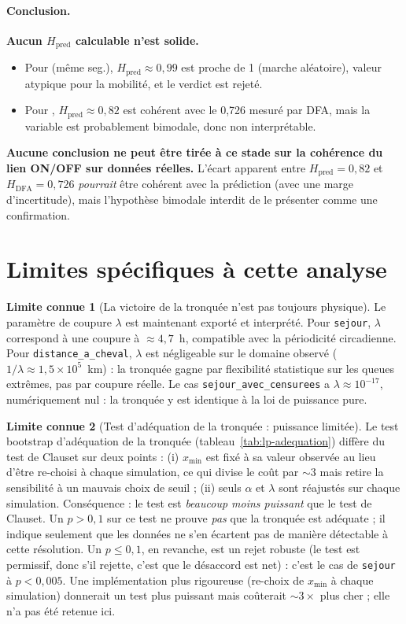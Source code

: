 \documentclass[12pt,a4paper]{report}
\theoremstyle{definition}
\newtheorem{limite}{Limite connue}[chapter]
\DeclareRobustCommand{\code}[1]{\texorpdfstring{\texttt{\detokenize{#1}}}{\detokenize{#1}}}
\begin{document}
\paragraph{Conclusion.} \textbf{Aucun $H_{\text{pred}}$ calculable n'est solide.}
\begin{itemize}
\item Pour \code{distance} (même seg.), $H_{\text{pred}} \approx 0{,}99$ est proche de 1
(marche aléatoire), valeur atypique pour la mobilité, et le verdict est rejeté.
\item Pour \code{sejour_avec_censurees}, $H_{\text{pred}} \approx 0{,}82$ est cohérent
avec le 0{,}726 mesuré par DFA, mais la variable est probablement bimodale, donc non
interprétable.
\end{itemize}
\textbf{Aucune conclusion ne peut être tirée à ce stade sur la cohérence du lien ON/OFF
sur données réelles.} L'écart apparent entre $H_{\text{pred}} = 0{,}82$ et
$H_{\text{DFA}} = 0{,}726$ \emph{pourrait} être cohérent avec la prédiction (avec une
marge d'incertitude), mais l'hypothèse bimodale interdit de le présenter comme une
confirmation.

\section{Limites spécifiques à cette analyse}

\begin{limite}[La victoire de la tronquée n'est pas toujours physique]
Le paramètre de coupure $\lambda$ est maintenant exporté et interprété. Pour
\texttt{sejour}, $\lambda$ correspond à une coupure à $\approx 4{,}7$~h, compatible avec
la périodicité circadienne. Pour \texttt{distance\_a\_cheval}, $\lambda$ est négligeable
sur le domaine observé ($1/\lambda \approx 1{,}5 \times 10^5$~km) : la tronquée gagne par
flexibilité statistique sur les queues extrêmes, pas par coupure réelle. Le cas
\texttt{sejour\_avec\_censurees} a $\lambda \approx 10^{-17}$, numériquement nul : la
tronquée y est identique à la loi de puissance pure.
\end{limite}

\begin{limite}[Test d'adéquation de la tronquée : puissance limitée]
Le test bootstrap d'adéquation de la tronquée (tableau~\ref{tab:lp-adequation})
diffère du test de Clauset sur deux points : (i) $x_{\min}$ est fixé à sa valeur
observée au lieu d'être re-choisi à chaque simulation, ce qui divise le coût par
$\sim 3$ mais retire la sensibilité à un mauvais choix de seuil ; (ii) seuls
$\alpha$ et $\lambda$ sont réajustés sur chaque simulation. Conséquence : le test
est \emph{beaucoup moins puissant} que le test de Clauset. Un $p > 0{,}1$ sur ce
test ne prouve \emph{pas} que la tronquée est adéquate ; il indique seulement que
les données ne s'en écartent pas de manière détectable à cette résolution. Un
$p \le 0{,}1$, en revanche, est un rejet robuste (le test est permissif, donc s'il
rejette, c'est que le désaccord est net) : c'est le cas de \texttt{sejour} à
$p<0{,}005$. Une implémentation plus rigoureuse (re-choix de $x_{\min}$ à chaque
simulation) donnerait un test plus puissant mais coûterait $\sim 3\times$ plus
cher ; elle n'a pas été retenue ici.
\end{limite}
\end{document}
